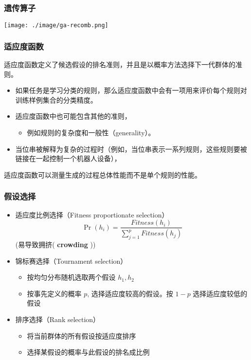 \documentclass{beamer}
\begin{document}
\begin{frame}
\frametitle{遗传算子}
\label{sec-3-5}

\texttt{[image: ./image/ga-recomb.png]}
\end{frame}
\begin{frame}
\frametitle{适应度函数}
\label{sec-3-6}

适应度函数定义了候选假设的排名准则，并且是以概率方法选择下一代群体的准则。
\begin{itemize}
\item 如果任务是学习分类的规则，那么适应度函数中会有一项用来评价每个规则对训练样例集合的分类精度。
\item 适应度函数中也可能包含其他的准则，
\begin{itemize}
\item 例如规则的复杂度和一般性（generality）。
\end{itemize}
\item 当位串被解释为复杂的过程时（例如，当位串表示一系列规则，这些规则要被链接在一起控制一个机器人设备），
\end{itemize}
适应度函数可以测量生成的过程总体性能而不是单个规则的性能。
\end{frame}
\begin{frame}
\frametitle{假设选择}
\label{sec-3-7}

\begin{itemize}
\item 适应度比例选择（Fitness proportionate selection）
    \[ \Pr(h_{i}) = \frac{Fitness(h_{i})}{\sum_{j=1}^{p} Fitness(h_{j})} \]
    (易导致拥挤( \textbf{crowding} ))
\item 锦标赛选择（Tournament selection）
\begin{itemize}
\item 按均匀分布随机选取两个假设 $h_1, h_2$
\item 按事先定义的概率 $p$, 选择适应度较高的假设。按 $1-p$ 选择适应度较低的假设
\end{itemize}
\item 排序选择（Rank selection）
\begin{itemize}
\item 将当前群体的所有假设按适应度排序
\item 选择某假设的概率与此假设的排名成比例
\end{itemize}
\end{itemize}
\end{frame}
\end{document}

